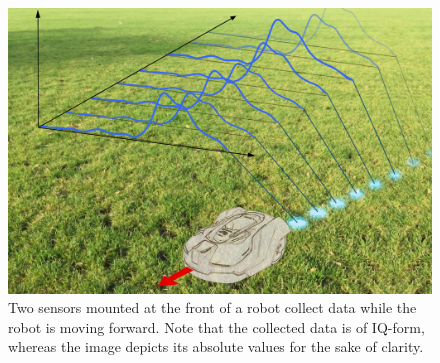 \begin{figure}[h]
	\centering
	\includegraphics[scale=0.60]{figs_temp/data_collecting.jpg}
	\caption{Two sensors mounted at the front of a robot collect data while the robot is moving forward. Note that the collected data is of IQ-form, whereas the image depicts its absolute values for the sake of clarity.}
	\label{fig:data_collecting}
\end{figure}





